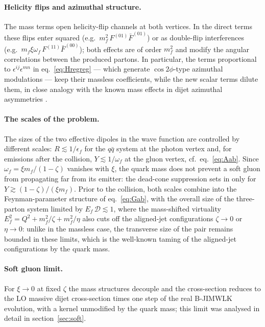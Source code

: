 \documentclass[11pt,a4paper]{article}
\newcommand{\calD}{\mathcal{D}}
\newcommand{\eps}{\epsilon}
\numberwithin{equation}{section}
\begin{document}
\paragraph{Helicity flips and azimuthal structure.} The mass terms open helicity-flip
channels at both vertices. In the direct terms these flips enter squared
(e.g.~$m_f^2\,F^{(01)}\bar F^{(01)}$) or as double-flip interferences
(e.g.~$m_f\xi\omega_f\,F^{(11)}\bar F^{(00)}$); both effects are of order $m_f^2$ and modify
the angular correlations between the produced partons. In particular, the terms proportional
to $\epsilon^{ij}\epsilon^{mn}$ in eq.~\eqref{eq:Hregreg} --- which generate
$\cos2\phi$-type azimuthal modulations --- keep their massless coefficients, while the new
scalar terms dilute them, in close analogy with the known mass effects in dijet azimuthal
asymmetries \cite{Altinoluk:2021ygv}.

\paragraph{The scales of the problem.} The sizes of the two effective dipoles in the wave
function are controlled by different scales: $R\lesssim 1/\eps_f$ for the $q\bar q$ system at
the photon vertex and, for emissions after the collision, $Y\lesssim1/\omega_f$ at the gluon
vertex, cf.~eq.~\eqref{eq:Aab}. Since $\omega_f=\xi m_f/(1-\zeta)$ vanishes with $\xi$, the
quark mass does not prevent a soft gluon from propagating far from its emitter: the dead-cone
suppression sets in only for $Y\gtrsim (1-\zeta)/(\xi m_f)$. Prior to the collision, both
scales combine into the Feynman-parameter structure of eq.~\eqref{eq:Gab}, with the overall
size of the three-parton system limited by $E_f\,\calD\lesssim 1$, where the mass-shifted
virtuality $E_f^2=Q^2+m_f^2/\zeta+m_f^2/\eta$ also cuts off the aligned-jet configurations
$\zeta\to0$ or $\eta\to 0$: unlike in the massless case, the transverse size of the pair
remains bounded in these limits, which is the well-known taming of the aligned-jet
configurations by the quark mass.

\paragraph{Soft gluon limit.} For $\xi\to 0$ at fixed $\zeta$ the mass structures decouple
and the cross-section reduces to the LO massive dijet cross-section times one step of the
real B-JIMWLK evolution, with a kernel unmodified by the quark mass; this limit was analysed
in detail in section~\ref{sec:soft}.
\end{document}
